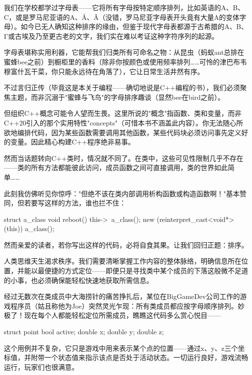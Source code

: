 
我们在学校都学过字母表——它将所有字母按特定顺序排列，比如英语的A、B、C，或是罗马尼亚语的A、Ă、Â（没错，罗马尼亚字母表开头竟有大量A的变体字母）。如今已无人确知这种排序的缘由，但鉴于现代字母表都源于古希腊的Α、Β、Γ或古埃及乃至更古老的文字，我们实在难以考证这种字符序列的起源。

字母表堪称实用利器，它能帮我们归类所有可命名之物：从昆虫（蚂蚁ant总排在蜜蜂bee之前）到橱柜里的香料（除非你按颜色或使用频率排列……可怜的津巴布韦穆富什瓦干菜，你只能永远待在角落了），它让日常生活井然有序。

不过言归正传（毕竟这是本关于编程——确切地说是C++编程的书），我们必须聚焦主题，而非沉溺于"蜜蜂与飞鸟"的字母排序趣谈（显然bee在bird之前）。

但组织C++概念可能令人望而生畏。这里所说的"概念"指函数、类和变量，而非C++20引入的那个实用特性"concepts"（可惜本书不涵盖此内容）。你无法随心所欲地编排代码，因为某些函数需要调用其他函数，某些代码块必须访问事先定义好的变量。因此精心构建C++程序绝非易事。

然而当话题转向C++类时，情况就不同了。在类中，这些可见性限制几乎不存在——类的所有方法都能彼此访问，成员函数之间可直接调用，类的世界如此简单……

此刻我仿佛听见你惊呼："但绝不该在类内部调用析构函数或构造函数啊！"基本赞同，但若要写这样的方法，谁也拦不住：

\begin{cpp}
struct a_class {
  void reboot() {
    this->~a_class();
    new (reinterpret_cast<void*>(this)) a_class();
  }
}
\end{cpp}

然而亲爱的读者，若你写出这样的代码，必将自食其果。让我们回归正题：排序。

人类思维天生渴求秩序。我们需要清晰掌握工作内容的整体脉络，明确信息所在位置，并能以最便捷的方式定位——即便只是寻找类中某个成员的下落这般微不足道的小事，也必须确保能轻松快速地获取所需信息。

经过无数次在类成员中大海捞针的痛苦挣扎后，某位在BigGameDev公司工作的游戏程序员（姑且称他为Joe）突然灵光乍现：所有类成员都应按字母顺序排列。妙极了！现在每个人都能轻松定位所需成员，瞧瞧这代码多么赏心悦目——

\begin{cpp}
struct point {
  bool active;
  double x;
  double y;
  double z;
}
\end{cpp}

这个用例并不复杂，它只是游戏中用来表示某个点的位置——通过x、y、z三个坐标值，并附带一个状态值来指示该点是否处于活动状态。一切运行良好，游戏流畅运行，玩家们也很满意。

